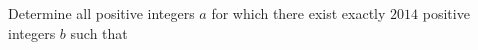 Determine all positive integers $a$ for which there exist exactly $2014$ positive integers $b$ such that 